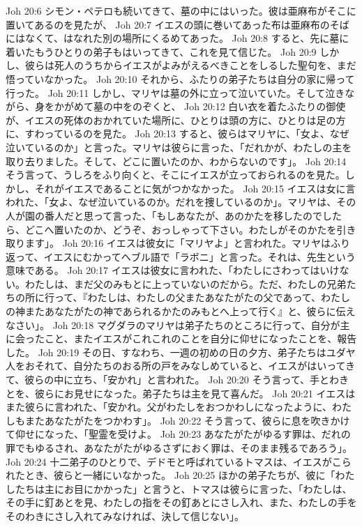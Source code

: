 Joh 20:6  シモン・ペテロも続いてきて、墓の中にはいった。彼は亜麻布がそこに置いてあるのを見たが、
Joh 20:7  イエスの頭に巻いてあった布は亜麻布のそばにはなくて、はなれた別の場所にくるめてあった。
Joh 20:8  すると、先に墓に着いたもうひとりの弟子もはいってきて、これを見て信じた。
Joh 20:9  しかし、彼らは死人のうちからイエスがよみがえるべきことをしるした聖句を、まだ悟っていなかった。
Joh 20:10  それから、ふたりの弟子たちは自分の家に帰って行った。
Joh 20:11  しかし、マリヤは墓の外に立って泣いていた。そして泣きながら、身をかがめて墓の中をのぞくと、
Joh 20:12  白い衣を着たふたりの御使が、イエスの死体のおかれていた場所に、ひとりは頭の方に、ひとりは足の方に、すわっているのを見た。
Joh 20:13  すると、彼らはマリヤに、「女よ、なぜ泣いているのか」と言った。マリヤは彼らに言った、「だれかが、わたしの主を取り去りました。そして、どこに置いたのか、わからないのです」。
Joh 20:14  そう言って、うしろをふり向くと、そこにイエスが立っておられるのを見た。しかし、それがイエスであることに気がつかなかった。
Joh 20:15  イエスは女に言われた、「女よ、なぜ泣いているのか。だれを捜しているのか」。マリヤは、その人が園の番人だと思って言った、「もしあなたが、あのかたを移したのでしたら、どこへ置いたのか、どうぞ、おっしゃって下さい。わたしがそのかたを引き取ります」。
Joh 20:16  イエスは彼女に「マリヤよ」と言われた。マリヤはふり返って、イエスにむかってヘブル語で「ラボニ」と言った。それは、先生という意味である。
Joh 20:17  イエスは彼女に言われた、「わたしにさわってはいけない。わたしは、まだ父のみもとに上っていないのだから。ただ、わたしの兄弟たちの所に行って、『わたしは、わたしの父またあなたがたの父であって、わたしの神またあなたがたの神であられるかたのみもとへ上って行く』と、彼らに伝えなさい」。
Joh 20:18  マグダラのマリヤは弟子たちのところに行って、自分が主に会ったこと、またイエスがこれこれのことを自分に仰せになったことを、報告した。
Joh 20:19  その日、すなわち、一週の初めの日の夕方、弟子たちはユダヤ人をおそれて、自分たちのおる所の戸をみなしめていると、イエスがはいってきて、彼らの中に立ち、「安かれ」と言われた。
Joh 20:20  そう言って、手とわきとを、彼らにお見せになった。弟子たちは主を見て喜んだ。
Joh 20:21  イエスはまた彼らに言われた、「安かれ。父がわたしをおつかわしになったように、わたしもまたあなたがたをつかわす」。
Joh 20:22  そう言って、彼らに息を吹きかけて仰せになった、「聖霊を受けよ。
Joh 20:23  あなたがたがゆるす罪は、だれの罪でもゆるされ、あなたがたがゆるさずにおく罪は、そのまま残るであろう」。
Joh 20:24  十二弟子のひとりで、デドモと呼ばれているトマスは、イエスがこられたとき、彼らと一緒にいなかった。
Joh 20:25  ほかの弟子たちが、彼に「わたしたちは主にお目にかかった」と言うと、トマスは彼らに言った、「わたしは、その手に釘あとを見、わたしの指をその釘あとにさし入れ、また、わたしの手をそのわきにさし入れてみなければ、決して信じない」。
